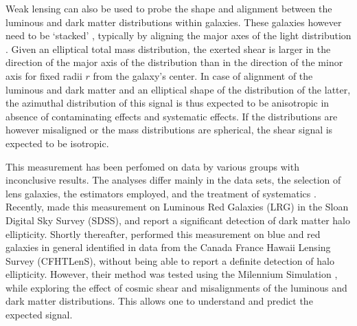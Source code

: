 \documentclass[useAMS,usenatbib]{mn2e}
\begin{document}
Weak lensing can also be used to probe the shape and alignment between the luminous and dark matter distributions within galaxies. These galaxies however need to be `stacked' \citep{2000astro.ph..6281B,2000ApJ...538L.113N}, typically by aligning the major axes of the light distribution \citep[e.g.][]{2004ApJ...606...67H}. Given an elliptical total mass distribution, the exerted shear is larger in the direction of the major axis of the distribution than in the direction of the minor axis for fixed radii $r$ from the galaxy's center. In case of alignment of the luminous and dark matter and an elliptical shape of the distribution of the latter, the azimuthal distribution of this signal is thus expected to be anisotropic in absence of contaminating effects \citep[e.g. intrinsic alignments][]{2004PhRvD..70f3526H} and systematic effects. If the distributions are however misaligned or the mass distributions are spherical, the shear signal is expected to be isotropic.

This measurement has been perfomed on data by various groups \citep[][]{2004ApJ...606...67H,2006MNRAS.370.1008M,2007ApJ...669...21P,2012A&A...545A..71V} with inconclusive results. The analyses differ mainly in the data sets, the selection of lens galaxies, the estimators employed, and the treatment of systematics \citep[see][]{2015arXiv150704301S}. Recently, \citet{2015arXiv150603536C} made this measurement on Luminous Red Galaxies (LRG) in the Sloan Digital Sky Survey (SDSS), and report a significant detection of dark matter halo ellipticity. Shortly thereafter, \citet{2015arXiv150704301S} performed this measurement on blue and red galaxies in general identified in data from the Canada France Hawaii Lensing Survey (CFHTLenS), without being able to report a definite detection of halo ellipticity. However, their method was tested using the Milennium Simulation \citep{2005Natur.435..629S}, while exploring the effect of cosmic shear and misalignments of the luminous and dark matter distributions. This allows one to understand and predict the expected signal.
\end{document}
